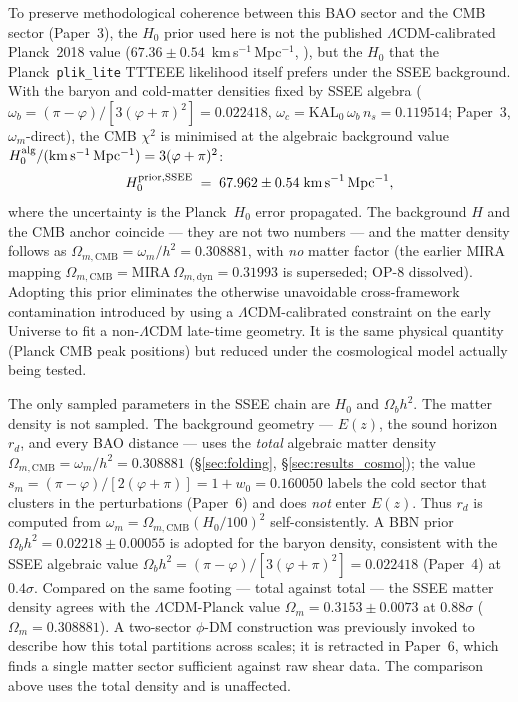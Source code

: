 \documentclass[12pt,a4paper]{article}
\begin{document}
To preserve methodological coherence between this BAO sector and the CMB
sector (Paper~3), the $H_0$ prior used here is not the published
$\Lambda$CDM-calibrated Planck~2018 value
($67.36\pm0.54$~km\,s$^{-1}$\,Mpc$^{-1}$, \citealt{Planck2018}),
but the $H_0$ that the Planck~\texttt{plik\_lite} TTTEEE likelihood itself
prefers under the SSEE background. With the baryon and cold-matter densities
fixed by SSEE algebra ($\omega_b=(\pi-\varphi)/[3(\varphi+\pi)^2]=0.022418$,
$\omega_c=\mathrm{KAL_0}\,\omega_b\,n_s=0.119514$; Paper~3, $\omega_m$-direct),
the CMB $\chi^2$ is minimised at the algebraic background value
$H_0^{\rm alg}/(\mathrm{km\,s^{-1}\,Mpc^{-1}})=3(\varphi+\pi)^2$:
\begin{equation}
  H_0^{\rm prior,SSEE} \;=\; 67.962\pm0.54 \;\text{km\,s}^{-1}\,\text{Mpc}^{-1},
  \label{eq:H0_prior_alg}
\end{equation}
where the uncertainty is the Planck~$H_0$ error propagated. The background
$H$ and the CMB anchor coincide --- they are not two numbers --- and the
matter density follows as $\Omega_{m,\mathrm{CMB}}=\omega_m/h^2=0.308881$,
with \emph{no} matter factor (the earlier MIRA mapping
$\Omega_{m,\mathrm{CMB}}=\mathrm{MIRA}\,\Omega_{m,\mathrm{dyn}}=0.31993$ is
superseded; OP-8 dissolved). Adopting this prior eliminates the otherwise unavoidable
cross-framework contamination introduced by using a $\Lambda$CDM-calibrated
constraint on the early Universe to fit a non-$\Lambda$CDM late-time
geometry. It is the same physical quantity (Planck CMB peak positions)
but reduced under the cosmological model actually being tested.

The only sampled parameters in the SSEE chain are $H_0$ and $\Omega_b h^2$.
The matter density is not sampled. The background geometry --- $E(z)$, the
sound horizon $r_d$, and every BAO distance --- uses the \emph{total} algebraic
matter density $\Omega_{m,\mathrm{CMB}}=\omega_m/h^2=0.308881$
(\S\ref{sec:folding}, \S\ref{sec:results_cosmo}); the value
$s_m=(\pi-\varphi)/[2(\varphi+\pi)]=1+w_0=0.160050$ labels the
cold sector that clusters in the perturbations (Paper~6) and does \emph{not}
enter $E(z)$. Thus $r_d$ is computed from
$\omega_m = \Omega_{m,\mathrm{CMB}}(H_0/100)^2$ self-consistently.
A BBN prior $\Omega_b h^2 = 0.02218\pm0.00055$ \citep{Cooke2018} is adopted
for the baryon density, consistent with the SSEE algebraic value
$\Omega_b h^2 = (\pi-\varphi)/[3(\varphi+\pi)^2] = 0.022418$ (Paper~4)
at $0.4\sigma$.
Compared on the same footing --- total against total --- the SSEE matter
density agrees with the $\Lambda$CDM-Planck value
$\Omega_m = 0.3153\pm0.0073$ at $0.88\sigma$ ($\Omega_m=0.308881$).
A two-sector $\phi$-DM construction was previously invoked to describe how
this total partitions across scales; it is retracted in Paper~6, which finds a
single matter sector sufficient against raw shear data. The comparison above
uses the total density and is unaffected.
\end{document}
